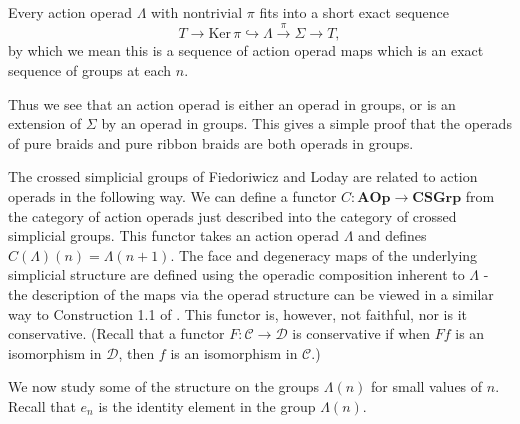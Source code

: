 \begin{cor}\label{extension}
Every action operad $\Lambda$ with nontrivial $\pi$ fits into a short exact sequence
  \[
    T \rightarrow \mathrm{Ker}\,\pi \hookrightarrow \Lambda \stackrel{\pi}{\longrightarrow} \Sigma \rightarrow T,
  \]
by which we mean this is a sequence of action operad maps which is an exact sequence of groups at each $n$.
\end{cor}

\begin{rem}
Thus we see that an action operad is either an operad in groups, or is an extension of $\Sigma$ by an operad in groups. This gives a simple proof that the operads of pure braids and pure ribbon braids are both operads in groups.
\end{rem}

\begin{rem}\label{rem:crossed}
The crossed simplicial groups of Fiedoriwicz and Loday \cite{FL91} are related to action operads in the following way. We can define a functor $C \colon \mathbf{AOp} \rightarrow \mathbf{CSGrp}$ from the category of action operads just described into the category of crossed simplicial groups. This functor takes an action operad $\Lambda$ and defines $C(\Lambda)(n) = \Lambda(n+1)$. The face and degeneracy maps of the underlying simplicial structure are defined using the operadic composition inherent to $\Lambda$ - the description of the maps via the operad structure can be viewed in a similar way to Construction 1.1 of \cite{Kra96}. This functor is, however, not faithful, nor is it conservative. (Recall that a functor $F \colon \mathcal{C} \rightarrow \mathcal{D}$ is conservative if when $Ff$ is an isomorphism in $\mathcal{D}$, then $f$ is an isomorphism in $\mathcal{C}$.)
\end{rem}

We now study some of the structure on the groups $\Lambda(n)$ for small values of $n$. Recall that $e_{n}$ is the identity element in the group $\Lambda(n)$.

